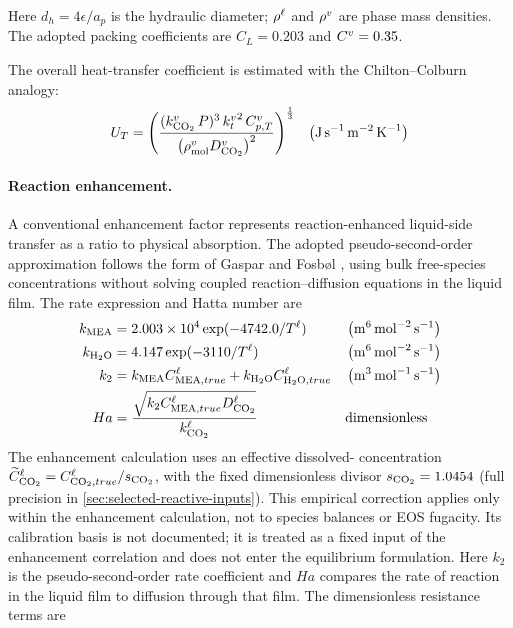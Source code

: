 Here \(d_h=4\epsilon/a_p\) is the hydraulic diameter; \(\rho^{\ell}\) and \(\rho^{v}\) are phase mass densities.
The adopted packing coefficients are \(C_L=0.203\) and \(C^{v}=0.35\).


The overall heat-transfer coefficient is estimated with the Chilton--Colburn analogy:
\begin{align}
U_T = \left(\frac{(k^{\vap}_{\COtwo}\,P)^3\,{k_{t}^{\vap}}^{2}\,C^{\vap}_{p,T}}{\left(\rho^{\vap}_{\text{mol}}D^{\vap}_{\COtwo}\right)^2}\right)^{\frac{1}{3}}
&& \left(\unit{J\,s^{-1}\,m^{-2}\,K^{-1}}\right)
\end{align}

\paragraph{Reaction enhancement.}
A conventional enhancement factor represents reaction-enhanced liquid-side \COtwo{} transfer as a ratio to physical absorption.
The adopted pseudo-second-order approximation follows the form of Gaspar and Fosb\o l \cite{Gaspar2015}, using bulk free-species concentrations without solving coupled reaction--diffusion equations in the liquid film.
The rate expression and Hatta number are
\begin{align}
k_{\MEA} &= 2.003\times10^4\exp(-4742.0/T^{\liq})
&& \left(\unit{m^6\,mol^{-2}\,s^{-1}}\right)\\
k_{\HtwoO} &= 4.147\exp(-3110/T^{\liq})
&& \left(\unit{m^6\,mol^{-2}\,s^{-1}}\right)\\
k_2 &= k_{\MEA}C^{\liq}_{\MEA,true}+k_{\HtwoO}C^{\liq}_{\HtwoO,true}
&& \left(\unit{m^3\,mol^{-1}\,s^{-1}}\right)\\
Ha &= \frac{\sqrt{k_2 C^{\liq}_{\MEA,true} D^{\liq}_{\COtwo}}}{k^{\liq}_{\COtwo}}
&& \text{dimensionless}
\end{align}
The enhancement calculation uses an effective dissolved-\COtwo{} concentration
$\widetilde C^{\liq}_{\COtwo}=C^{\liq}_{\COtwo,true}/s_{\COtwo}$, with the fixed dimensionless divisor
$s_{\COtwo}=1.0454$ (full precision in \cref{sec:selected-reactive-inputs}).
This empirical correction applies only within the enhancement calculation, not to species balances or EOS fugacity.
Its calibration basis is not documented; it is treated as a fixed input of the enhancement correlation and does not enter the equilibrium formulation.
Here $k_2$ is the pseudo-second-order rate coefficient and $Ha$ compares the rate of reaction in the liquid film to diffusion through that film.
The dimensionless resistance terms are
